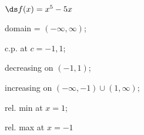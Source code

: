 {$\ds f(x) =x^5-5x$
}
{domain = $(-\infty,\infty)$;

c.p. at $c=-1,1$;

decreasing on $(-1,1)$;

increasing on $(-\infty,-1) \cup (1,\infty)$;

rel. min at $x=1$;

rel. max at $x=-1$
}
